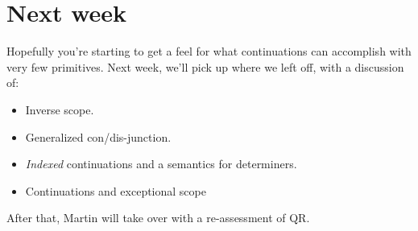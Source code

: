 \documentclass[nols,nofonts,nobib,nohyper]{tufte-book}
\begin{document}




\section{Next week}

Hopefully you're starting to get a feel for what continuations can accomplish
with very few primitives. Next week, we'll pick up where we left off, with a
discussion of:

\begin{itemize}

  \item Inverse scope.

  \item Generalized con/dis-junction.

  \item \textit{Indexed} continuations and a semantics for determiners.

  \item Continuations and exceptional scope

\end{itemize}

After that, Martin will take over with a re-assessment of QR.

\printbibliography



\printbibliography
\end{document}
